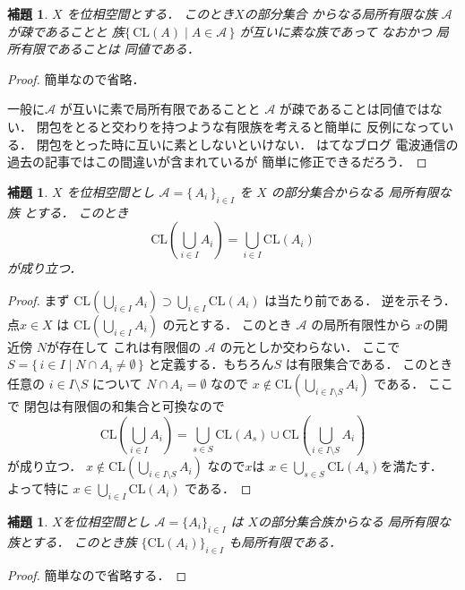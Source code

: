 \documentclass[leqno, a4paper, 12pt]{jsarticle}
\newtheorem{lem}[thm]{補題}
\newcommand{\cl}{\mathrm{CL}}
\begin{document}
\begin{lem}\label{lem:sososo}
$X$
を位相空間とする．
このとき$X$の部分集合
からなる局所有限な族
$\mathcal{A}$
が疎であることと
族$\{\, \cl(A)\mid A\in \mathcal{A}\, \}$
が互いに素な族であって
なおかつ
局所有限であることは
同値である．
\end{lem}
\begin{proof}
簡単なので省略．

一般に$\mathcal{A}$
が互いに素で局所有限であることと
$\mathcal{A}$
が疎であることは同値ではない．
閉包をとると交わりを持つような有限族を考えると簡単に
反例になっている．
閉包をとった時に互いに素としないといけない．
はてなブログ
電波通信の過去の記事ではこの間違いが含まれているが
簡単に修正できるだろう．
\end{proof}


\begin{lem}\label{lem:clcup}
$X$
を位相空間とし
$\mathcal{A}=\{\, A_{i}\, \}_{i\in I}$
を
$X$
の部分集合からなる
局所有限な
族
とする．
このとき
\[
\cl\left(\bigcup_{i\in I}A_{i}\right)
=
\bigcup_{i\in I}\cl(A_{i})
\]
が成り立つ．
\end{lem}
\begin{proof}
まず
$\cl\left(\bigcup_{i\in I}A_{i}\right)
\supset \bigcup_{i\in I}\cl(A_{i})$
は当たり前である．
逆を示そう．
点$x\in X$
は
$\cl\left(\bigcup_{i\in I}A_{i}\right)$
の元とする．
このとき
$\mathcal{A}$
の局所有限性から
$x$の開近傍
$N$が存在して
これは有限個の
$\mathcal{A}$
の元としか交わらない．
ここで
$S=\{\,i\in I\mid N\cap A_{i}\neq\emptyset\, \}$
と定義する．もちろん$S$
は有限集合である．
このとき任意の
$i\in I\setminus S$
について
$N\cap A_{i}=\emptyset$
なので
$x\not \in \cl\left(\bigcup_{i\in I \setminus S}A_{i}\right)$
である．
ここで
閉包は有限個の和集合と可換なので
\[
\cl\left(\bigcup_{i\in I}A_{i}\right)
=\bigcup_{s\in S}\cl(A_{s})\cup \cl\left(\bigcup_{i\in I \setminus S}A_{i}\right)
\]
が成り立つ．
$x\not \in \cl\left(\bigcup_{i\in I \setminus S}A_{i}\right)$
なので$x$は
$x\in \bigcup_{s\in S}\cl(A_{s})$を満たす．
よって特に
$x\in \bigcup_{i\in I}\cl(A_{i})$
である．
\end{proof}


\begin{lem}\label{lem:closurefin}
$X$を位相空間とし
$\mathcal{A}=\{A_{i}\}_{i\in I}$
は
$X$の部分集合族からなる
局所有限な族とする．
このとき族
$\{\cl(A_{i})\}_{i\in I}$
も局所有限である．
\end{lem}
\begin{proof}
簡単なので省略する．
\end{proof}
\end{document}
